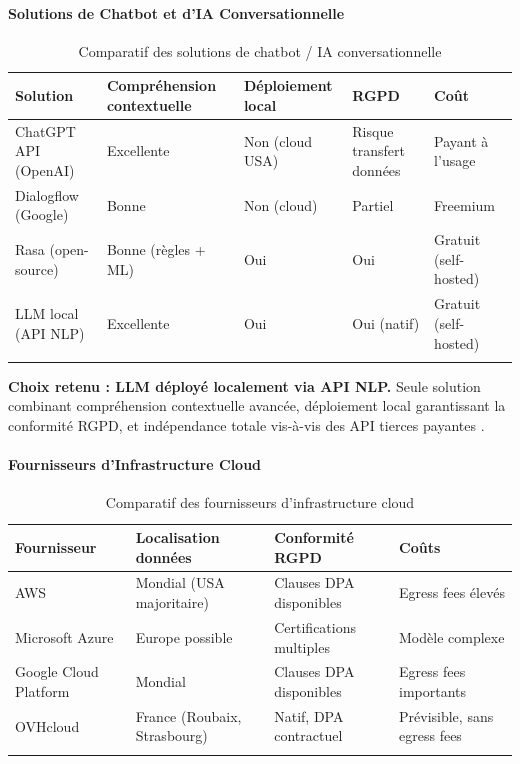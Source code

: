 \paragraph{Solutions de Chatbot et d'IA Conversationnelle}

\begin{longtable}{|m{3.5cm}|m{3cm}|m{2cm}|m{2cm}|m{2cm}|}
\hline
\textbf{Solution} & \textbf{Compréhension contextuelle} & \textbf{Déploiement local} & \textbf{RGPD} & \textbf{Coût} \\
\hline
\endhead
\endfoot
\endlastfoot
\hline
ChatGPT API (OpenAI) & Excellente & Non (cloud USA) & Risque transfert données & Payant à l'usage \\
\hline
Dialogflow (Google) & Bonne & Non (cloud) & Partiel & Freemium \\
\hline
Rasa (open-source) & Bonne (règles + ML) & Oui & Oui & Gratuit (self-hosted) \\
\hline
LLM local (API NLP) & Excellente & Oui & Oui (natif) & Gratuit (self-hosted) \\
\hline
\captionsetup{justification=centering,margin=2cm}
\caption{Comparatif des solutions de chatbot / IA conversationnelle}
\label{tab:chatbot}
\end{longtable}

\textbf{Choix retenu : LLM déployé localement via API NLP.} Seule solution combinant compréhension contextuelle avancée, déploiement local garantissant la conformité RGPD, et indépendance totale vis-à-vis des API tierces payantes \cite{whisper}.

\paragraph{Fournisseurs d'Infrastructure Cloud}

\begin{longtable}{|m{3cm}|m{3.5cm}|m{3cm}|m{3cm}|}
\hline
\textbf{Fournisseur} & \textbf{Localisation données} & \textbf{Conformité RGPD} & \textbf{Coûts} \\
\hline
\endhead
\endfoot
\endlastfoot
\hline
AWS & Mondial (USA majoritaire) & Clauses DPA disponibles & Egress fees élevés \\
\hline
Microsoft Azure & Europe possible & Certifications multiples & Modèle complexe \\
\hline
Google Cloud Platform & Mondial & Clauses DPA disponibles & Egress fees importants \\
\hline
OVHcloud & France (Roubaix, Strasbourg) & Natif, DPA contractuel & Prévisible, sans egress fees \\
\hline
\captionsetup{justification=centering,margin=2cm}
\caption{Comparatif des fournisseurs d'infrastructure cloud}
\label{tab:cloud}
\end{longtable}

